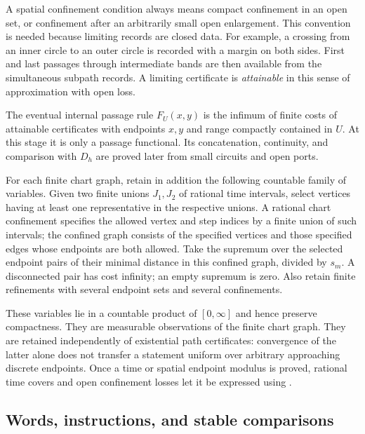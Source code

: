 A spatial confinement condition always means compact confinement in an open set, or confinement after an arbitrarily small open enlargement. This convention is needed because limiting records are closed data. For example, a crossing from an inner circle to an outer circle is recorded with a margin on both sides. First and last passages through intermediate bands are then available from the simultaneous subpath records. A limiting certificate is \emph{attainable} in this sense of approximation with open loss.

The eventual internal passage rule \(F_U(x,y)\) is the infimum of finite costs of attainable certificates with endpoints \(x,y\) and range compactly contained in \(U\). At this stage it is only a passage functional. Its concatenation, continuity, and comparison with \(D_h\) are proved later from small circuits and open ports.

\begin{definition}\label{bg:universal-tests}
For each finite chart graph, retain in addition the following countable family of variables. Given two finite unions \(J_1,J_2\) of rational time intervals, select vertices having at least one representative in the respective unions. A rational chart confinement specifies the allowed vertex and step indices by a finite union of such intervals; the confined graph consists of the specified vertices and those specified edges whose endpoints are both allowed. Take the supremum over the selected endpoint pairs of their minimal distance in this confined graph, divided by \(s_m\). A disconnected pair has cost infinity; an empty supremum is zero. Also retain finite refinements with several endpoint sets and several confinements.
\end{definition}

These variables lie in a countable product of \([0,\infty]\) and hence preserve compactness. They are measurable observations of the finite chart graph. They are retained independently of existential path certificates: convergence of the latter alone does not transfer a statement uniform over arbitrary approaching discrete endpoints. Once a time or spatial endpoint modulus is proved, rational time covers and open confinement losses let it be expressed using .

\subsection{Words, instructions, and stable comparisons}

